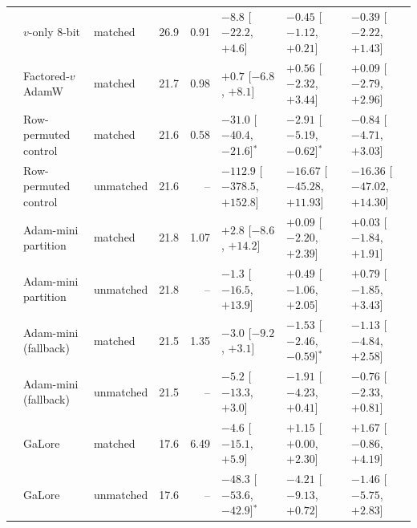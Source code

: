 \begin{tabular}{lllrrlll}
 & $v$-only 8-bit & matched & 26.9 & 0.91 & $-8.8$ [$-22.2$, $+4.6$] & $-0.45$ [$-1.12$, $+0.21$] & $-0.39$ [$-2.22$, $+1.43$] \\
 & Factored-$v$ AdamW & matched & 21.7 & 0.98 & $+0.7$ [$-6.8$, $+8.1$] & $+0.56$ [$-2.32$, $+3.44$] & $+0.09$ [$-2.79$, $+2.96$] \\
 & Row-permuted control & matched & 21.6 & 0.58 & $-31.0$ [$-40.4$, $-21.6$]$^{*}$ & $-2.91$ [$-5.19$, $-0.62$]$^{*}$ & $-0.84$ [$-4.71$, $+3.03$] \\
 & Row-permuted control & unmatched & 21.6 & -- & $-112.9$ [$-378.5$, $+152.8$] & $-16.67$ [$-45.28$, $+11.93$] & $-16.36$ [$-47.02$, $+14.30$] \\
 & Adam-mini partition & matched & 21.8 & 1.07 & $+2.8$ [$-8.6$, $+14.2$] & $+0.09$ [$-2.20$, $+2.39$] & $+0.03$ [$-1.84$, $+1.91$] \\
 & Adam-mini partition & unmatched & 21.8 & -- & $-1.3$ [$-16.5$, $+13.9$] & $+0.49$ [$-1.06$, $+2.05$] & $+0.79$ [$-1.85$, $+3.43$] \\
 & Adam-mini (fallback) & matched & 21.5 & 1.35 & $-3.0$ [$-9.2$, $+3.1$] & $-1.53$ [$-2.46$, $-0.59$]$^{*}$ & $-1.13$ [$-4.84$, $+2.58$] \\
 & Adam-mini (fallback) & unmatched & 21.5 & -- & $-5.2$ [$-13.3$, $+3.0$] & $-1.91$ [$-4.23$, $+0.41$] & $-0.76$ [$-2.33$, $+0.81$] \\
 & GaLore & matched & 17.6 & 6.49 & $-4.6$ [$-15.1$, $+5.9$] & $+1.15$ [$+0.00$, $+2.30$] & $+1.67$ [$-0.86$, $+4.19$] \\
 & GaLore & unmatched & 17.6 & -- & $-48.3$ [$-53.6$, $-42.9$]$^{*}$ & $-4.21$ [$-9.13$, $+0.72$] & $-1.46$ [$-5.75$, $+2.83$] \\
\bottomrule
\end{tabular}
